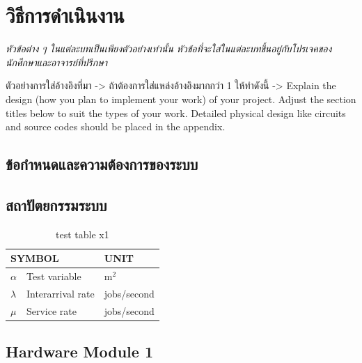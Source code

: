 \documentclass[12pt,oneside,openright,a4paper]{cpe-thai-project}
\begin{document}
\chapter{วิธีการดำเนินงาน}

\emph{หัวข้อต่าง ๆ ในแต่ละบทเป็นเพียงตัวอย่างเท่านั้น หัวข้อที่จะใส่ในแต่ละบทขึ้นอยู่กับโปรเจคของนักศึกษาและอาจารย์ที่ปรึกษา}


ตัวอย่างการใส่อ้างอิงที่มา -> \cite{hypersense} ถ้าต้องการใส่แหล่งอ้างอิงมากกว่า 1 ให้ทำดังนี้ -> \cite{hypersense,bworld}
Explain the design (how you plan to implement your work) of your project. Adjust the section titles below to suit the types of your work. Detailed physical design like circuits and source codes should be placed in the appendix.

\section{ข้อกำหนดและความต้องการของระบบ}

\section{สถาปัตยกรรมระบบ}

\begin{table}[!h]
  \centering
  \caption{test table x1}\label{tbl:symbols}
  \begin{tabular}{@{}p{}|p{}p{}}\hline
    \multicolumn{2}{l}{\textbf{SYMBOL}} & \textbf{UNIT}                         \\ \hline
    $\alpha$                            & Test variable\hfill     & m$^2$       \\
    $\lambda$                           & Interarrival rate\hfill & jobs/second \\
    $\mu$                               & Service rate\hfill      & jobs/second \\ \hline
  \end{tabular}
\end{table}



\section{Hardware Module 1}
\end{document}
